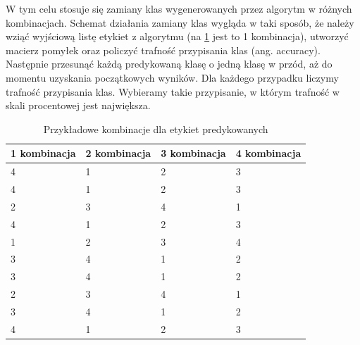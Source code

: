     W tym celu stosuje się zamiany klas wygenerowanych przez algorytm w różnych kombinacjach. Schemat działania zamiany klas wygląda w taki sposób, że należy wziąć wyjściową listę etykiet z algorytmu (na \ref{tab:kombinacje} jest to 1 kombinacja), utworzyć macierz pomyłek oraz policzyć trafność przypisania klas (ang. accuracy). Następnie przesunąć każdą predykowaną klasę o jedną klasę w przód, aż do momentu uzyskania początkowych wyników. Dla każdego przypadku liczymy trafność przypisania klas. Wybieramy takie przypisanie, w którym trafność w skali procentowej jest największa.
    \begin{table}[h!]
    \centering
    \caption{Przykładowe kombinacje dla etykiet predykowanych}
    \label{tab:kombinacje}
    \begin{tabular}{|l|l|l|l|}
    \hline
    1 kombinacja & 2 kombinacja & 3 kombinacja & 4 kombinacja \\ \hline
    4           & 1            & 2            & 3            \\ \hline
    4           & 1            & 2            & 3            \\ \hline
    2           & 3            & 4            & 1            \\ \hline
    4           & 1            & 2            & 3            \\ \hline
    1           & 2            & 3            & 4            \\ \hline
    3           & 4            & 1            & 2            \\ \hline
    3           & 4            & 1            & 2            \\ \hline
    2           & 3            & 4            & 1            \\ \hline
    3           & 4            & 1            & 2            \\ \hline
    4           & 1            & 2            & 3            \\ \hline
    \end{tabular}
    \end{table}